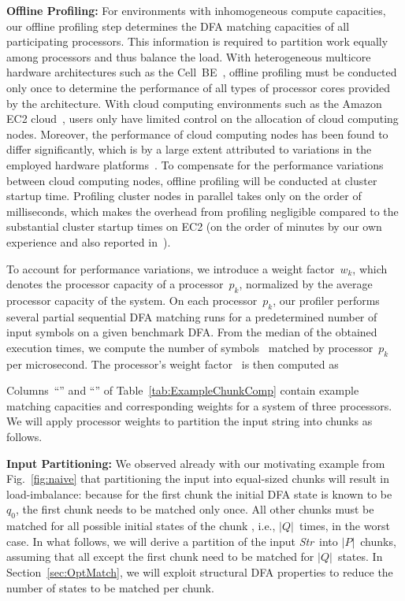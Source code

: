 \documentclass[smallextended]{svjour3}
\newcommand\States{\ensuremath{Q}}
\newcommand\NrStates{\ensuremath{\lvert\States\rvert}}
\newcommand\State[1][{}]{\ensuremath{q_{#1}}}
\newcommand\StartState{\ensuremath{\State[0]}}
\newcommand\Processors{\ensuremath{P}}
\newcommand\NrProcessors{\ensuremath{\lvert\Processors\rvert}}
\newcommand\Processor[1][{}]{\ensuremath{p_{#1}}}
\newcommand\Weight[1][{}]{\ensuremath{{w_{#1}}}}
\newcommand\STR{\textit{Str}}
\begin{document}
{\bf Offline Profiling:}
For environments with inhomogeneous compute capacities, our 
offline profiling step determines the DFA matching
capacities of all participating processors. This information is required to partition
work equally among processors and thus balance the load.
With
heterogeneous multicore hardware architectures such as
the Cell~BE~\cite{CellAccelerators}, offline profiling must 
be conducted only once to determine
the performance of all types of processor cores provided by the architecture.
With cloud computing environments such as the Amazon EC2 cloud~\cite{EC2}, users only
have limited control on the allocation of cloud computing nodes. Moreover,
the performance of cloud computing nodes has been found
to differ significantly, which is by a large extent
attributed to variations in the employed hardware platforms~\cite{EC2Perf,Armbrust2009}. 
To compensate for the performance variations between cloud computing nodes,
offline profiling will be conducted at cluster startup time. Profiling cluster nodes
in parallel takes only on the order of milliseconds, which makes the overhead from
profiling negligible compared to the substantial cluster startup times
on EC2 (on the order of minutes
by our own experience and
also reported in~\cite{Ostermann09}).

To account for performance variations,
we introduce
a weight factor~\Weight[k], which denotes the processor capacity
of a processor~\Processor[k], normalized by the average
processor capacity of the system. 
On each processor~\Processor[k],
our profiler performs several partial sequential DFA
matching runs for a predetermined
number of input symbols on a given benchmark DFA. From the median of the obtained execution
times, we compute the number of symbols~ matched by processor~\Processor[k] per microsecond.
The processor's
weight factor~ is then
computed as

Columns~``''
and ``'' of Table~\ref{tab:ExampleChunkComp} contain example matching capacities
and corresponding weights for a system of three processors. 
We will apply processor weights to partition
the input string into chunks as follows.

{\bf Input Partitioning:}\label{sec:BasicMatching}
We observed already with our motivating example
from Fig.~\ref{fig:naive} that partitioning the input into
equal-sized chunks will result in load-imbalance: because
for the first chunk the initial DFA state is known to be~\StartState,
the first chunk needs to be matched only once.  
All other chunks must be matched for all possible initial states of the 
chunk , i.e., \NrStates~times,
in the worst case. In what follows, we will derive a partition of the input \STR\
into \NrProcessors~chunks, assuming that all except the first chunk need
to be matched for \NrStates\ states. In Section~\ref{sec:OptMatch}, we will exploit
structural DFA properties to reduce the number of states to be matched per chunk.
\end{document}
